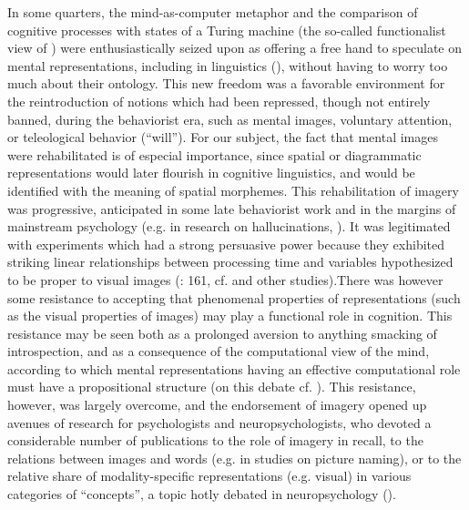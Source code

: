 \documentclass[output=paper]{langscibook}
\begin{document}
In some quarters, the mind-as-computer metaphor and the comparison of cognitive processes with states of a Turing machine (the so-called functionalist view of \citealt{putnam_minds_1960}) were enthusiastically seized upon as offering a free hand to speculate on mental representations, including in linguistics (\citealt{katz_mentalism_1964}), without having to worry too much about their ontology. This new freedom was a favorable environment for the reintroduction of notions which had been repressed, though not entirely banned, during the behaviorist era, such as mental images, voluntary attention, or teleological behavior (“will”). For our subject, the fact that mental images were rehabilitated is of especial importance, since spatial or diagrammatic representations would later flourish in cognitive linguistics, and would be identified with the meaning of spatial morphemes. This rehabilitation of imagery was progressive, anticipated in some late behaviorist work \citep[281ff]{Mowrer 1962} and in the margins of mainstream psychology (e.g. in research on hallucinations, \citealt{holt_imagery:_1964}). It was legitimated with experiments which had a strong persuasive power because they exhibited striking linear relationships between processing time and variables hypothesized to be proper to visual images (\citealt{baars_cognitive_1986}: 161, cf. \citealt{shepard_mental_1971} and other studies).There was however some resistance to accepting that phenomenal properties of representations (such as the visual properties of images) may play a functional role in cognition. This resistance may be seen both as a prolonged aversion to anything smacking of introspection, and as a consequence of the computational view of the mind, according to which mental representations having an effective computational role must have a propositional structure (on this debate cf. \citealt{fortis_image_1994}). This resistance, however, was largely overcome, and the endorsement of imagery opened up avenues of research for psychologists and neuropsychologists, who devoted a considerable number of publications to the role of imagery in recall, to the relations between images and words (e.g. in studies on picture naming), or to the relative share of modality-specific representations (e.g. visual) in various categories of “concepts”, a topic hotly debated in neuropsychology (\citealt{fortis_signification_1997}).
\end{document}
